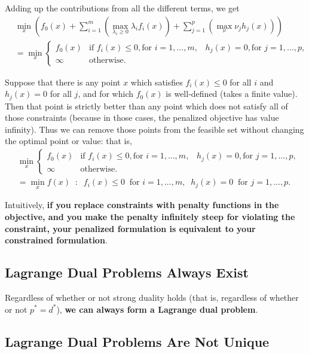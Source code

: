 \documentclass[12pt]{article}
\begin{document}
Adding up the contributions from all the different terms, we get
%
\begin{align*}
& \min_x \left( f_0 (x) + \sum_{i=1}^m \left(\max_{\lambda_i \geq 0} \lambda_i f_i (x)\right) + \sum_{j=1}^p \left( \max_{\nu} \nu_j h_j (x) \right) \right) \\
&= \min_x \left\{ \begin{array}{ll} 
f_0 (x)  & \text{if } f_i (x) \leq 0, \text{for } i=1, ..., m, \;\;\; h_j (x) = 0, \text{for } j = 1, ..., p, \\
\infty & \text{otherwise}.
\end{array} \right.
\end{align*}

Suppose that there is any point $x$ which satisfies $f_i (x) \leq 0$ for all $i$ and $h_j (x) = 0$ for all $j$, and for which $f_0 (x)$ is well-defined (takes a finite value). Then that point is strictly better than any point which does not satisfy all of those constraints (because in those cases, the penalized objective has value infinity). Thus we can remove those points from the feasible set without changing the optimal point or value: that is, 
%
\begin{align*}
& \min_x \left\{ \begin{array}{ll} 
f_0 (x)  & \text{if } f_i (x) \leq 0, \text{for } i=1, ..., m, \;\;\; h_j (x) = 0, \text{for } j = 1, ..., p, \\
\infty & \text{otherwise}.
\end{array} \right. \\
&= \min_x f(x) \;\; : \;\; f_i (x) \leq 0 \;\; \text{for } i=1,..., m, \;\; h_j (x) = 0 \;\; \text{for } j=1,..., p. 
\end{align*}

Intuitively, \textbf{if you replace constraints with penalty functions in the objective, and you make the penalty infinitely steep for violating the constraint, your penalized formulation is equivalent to your constrained formulation}. 


\subsection{Lagrange Dual Problems Always Exist}

Regardless of whether or not strong duality holds (that is, regardless of whether or not $p^* = d^*$), \textbf{we can always form a Lagrange dual problem}. 

\subsection{Lagrange Dual Problems Are Not Unique}
\end{document}
